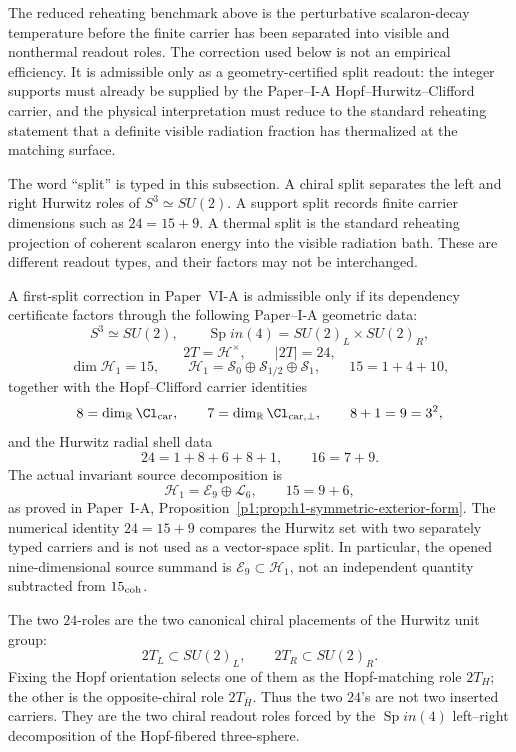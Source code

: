 \documentclass[12pt,a4paper]{article}
\begin{document}
The reduced reheating benchmark above is the perturbative scalaron-decay
temperature before the finite carrier has been separated into visible and
nonthermal readout roles.  The correction used below is not an empirical
efficiency.  It is admissible only as a geometry-certified split readout: the
integer supports must already be supplied by the Paper--I-A Hopf--Hurwitz--Clifford
carrier, and the physical interpretation must reduce to the standard reheating
statement that a definite visible radiation fraction has thermalized at the
matching surface.

The word ``split'' is typed in this subsection.  A chiral split separates the
left and right Hurwitz roles of \(S^3\simeq SU(2)\).  A support split records
finite carrier dimensions such as \(24=15+9\).  A thermal split is the standard
reheating projection of coherent scalaron energy into the visible radiation bath.
These are different readout types, and their factors may not be interchanged.

\begin{definition}
\label{p8:def:first-split-geometry-certificate}
A first-split correction in Paper~VI-A is admissible only if its dependency
certificate factors through the following Paper--I-A geometric data:
\[
S^3\simeq SU(2),\qquad
\operatorname{Sp}in(4)=SU(2)_L\times SU(2)_R,
\]
\[
2T=\mathcal H^\times,\qquad |2T|=24,
\]
\[
\dim \mathcal H_1=15,\qquad
\mathcal H_1=\mathcal S_0\oplus\mathcal S_{1/2}\oplus\mathcal S_1,
\qquad
15=1+4+10,
\]
together with the Hopf--Clifford carrier identities
\[
8=\dim_{\mathbb R}\Cl_{\rm car},
\qquad
7=\dim_{\mathbb R}\Cl_{\rm car,\perp},
\qquad
8+1=9=3^2,
\]
and the Hurwitz radial shell data
\[
24=1+8+6+8+1,\qquad
16=7+9.
\]
The actual invariant source decomposition is
\[
\boxed{\mathcal H_1=\mathcal E_9\oplus\mathcal L_6,
\qquad15=9+6,}
\]
as proved in Paper~I-A,
Proposition~\ref{p1:prop:h1-symmetric-exterior-form}.  The numerical identity
\(24=15+9\) compares the Hurwitz set with two separately typed carriers and is
not used as a vector-space split.  In particular, the opened nine-dimensional
source summand is \(\mathcal E_9\subset\mathcal H_1\), not an independent
quantity subtracted from \(15_{\rm coh}\).
\end{definition}

\begin{definition}
\label{p8:def:hopf-chiral-hurwitz-roles}
The two \(24\)-roles are the two canonical chiral placements of the Hurwitz unit
group:
\[
2T_L\subset SU(2)_L,
\qquad
2T_R\subset SU(2)_R .
\]
Fixing the Hopf orientation selects one of them as the Hopf-matching role
\(2T_H\); the other is the opposite-chiral role \(2T_{\bar H}\).  Thus the two
\(24\)'s are not two inserted carriers.  They are the two chiral readout roles
forced by the \(\operatorname{Sp}in(4)\) left--right decomposition of the Hopf-fibered
three-sphere.
\end{definition}
\end{document}
